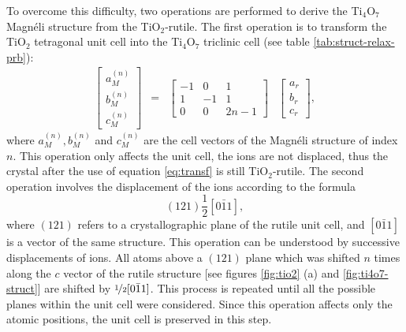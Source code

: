 To overcome this difficulty, two operations are performed to derive the Ti$_4$O$_7$ Magnéli structure from the TiO$_2$-rutile. The first operation is to transform the TiO$_2$ tetragonal unit cell into the Ti$_4$O$_7$ triclinic cell \cite{Wood1981} (see table \ref{tab:struct-relax-prb}):
\begin{equation}
 \begin{array}{cccc}
 \left[ \begin{array}{c} a_M^{(n)} \\ b_M^{(n)} \\ c_M^{(n)} \end{array} \right] & = & \left[ \begin{array}{ccc} -1 & 0 & 1 \\ 1 & -1 & 1 \\ 0 & 0 & 2n-1 \end{array} \right] & \left[ \begin{array}{c} a_r \\ b_r \\ c_r \end{array} \right],
 \end{array}
 \label{eq:transf}
\end{equation}
where $a_M^{(n)}, b_M^{(n)}$ and $c_M^{(n)}$ are the cell vectors of the Magnéli structure of index $n$. This operation only affects the unit cell, the ions are not displaced, thus the crystal after the use of equation \ref{eq:transf} is still TiO$_2$-rutile. The second operation involves the displacement of the ions according to the formula \cite{Andersson1960,Harada2010,Anderson19671393}
\begin{equation}
  (121) \frac{1}{2}[0\bar{1}1],
  \label{eq:displ}
\end{equation}
where $(121)$ refers to a crystallographic plane of the rutile unit cell, and $[0\bar{1}1]$ is a vector of the same structure. This operation can be understood by successive displacements of ions. All atoms above a $(121)$ plane which was shifted $n$ times along the $c$ vector of the rutile structure [see figures \ref{fig:tio2} (a) and \ref{fig:ti4o7-struct}] are shifted by $\nicefrac{1}{2}[0\bar{1}1]$. This process is repeated until all the possible planes within the unit cell were considered. Since this operation affects only the atomic positions, the unit cell is preserved in this step.

